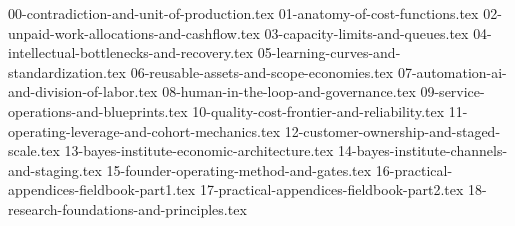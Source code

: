 
{00-contradiction-and-unit-of-production.tex}
{01-anatomy-of-cost-functions.tex}
{02-unpaid-work-allocations-and-cashflow.tex}
{03-capacity-limits-and-queues.tex}
{04-intellectual-bottlenecks-and-recovery.tex}
{05-learning-curves-and-standardization.tex}
{06-reusable-assets-and-scope-economies.tex}
{07-automation-ai-and-division-of-labor.tex}
{08-human-in-the-loop-and-governance.tex}
{09-service-operations-and-blueprints.tex}
{10-quality-cost-frontier-and-reliability.tex}
{11-operating-leverage-and-cohort-mechanics.tex}
{12-customer-ownership-and-staged-scale.tex}
{13-bayes-institute-economic-architecture.tex}
{14-bayes-institute-channels-and-staging.tex}
{15-founder-operating-method-and-gates.tex}
{16-practical-appendices-fieldbook-part1.tex}
{17-practical-appendices-fieldbook-part2.tex}
{18-research-foundations-and-principles.tex}
